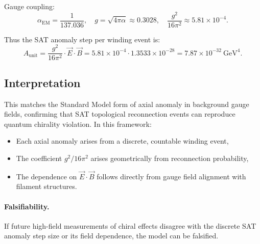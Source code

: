 Gauge coupling:
\[
  \alpha_{\text{EM}} = \frac{1}{137.036}, \quad
  g = \sqrt{4\pi\alpha} \approx 0.3028, \quad
  \frac{g^2}{16\pi^2} \approx 5.81 \times 10^{-4}.
\]

Thus the SAT anomaly step per winding event is:
\begin{equation}
  A_{\text{unit}} = \frac{g^2}{16\pi^2} \cdot \vec{E} \cdot \vec{B}
  = 5.81 \times 10^{-4} \cdot 1.3533 \times 10^{-28}
  = 7.87 \times 10^{-32}~\text{GeV}^4.
\end{equation}

\subsection{Interpretation}

This matches the Standard Model form of axial anomaly in background
gauge fields, confirming that SAT topological reconnection events can
reproduce quantum chirality violation. In this framework:
\begin{itemize}
  \item Each axial anomaly arises from a discrete, countable winding event,
  \item The coefficient $g^2/16\pi^2$ arises geometrically from reconnection probability,
  \item The dependence on $\vec{E} \cdot \vec{B}$ follows directly from
        gauge field alignment with filament structures.
\end{itemize}

\paragraph{Falsifiability.}
If future high-field measurements of chiral effects disagree with the
discrete SAT anomaly step size or its field dependence, the model can be falsified.

